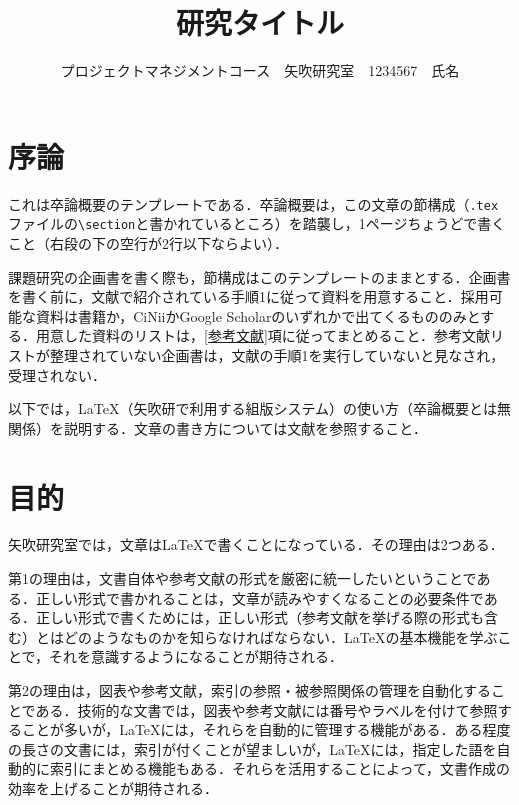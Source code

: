 \documentclass[uplatex,twocolumn,dvipdfmx]{jsarticle}
\title{\vspace{-5mm}\fontsize{14pt}{0pt}\selectfont 研究タイトル}
\author{\normalsize プロジェクトマネジメントコース　矢吹研究室　1234567　氏名}
\date{}
\begin{document}
\fontsize{10.5pt}{\baselineskip}\selectfont
\maketitle





\section{序論}

これは卒論概要のテンプレートである．卒論概要は，この文章の節構成（\verb|.tex|ファイルの\verb|\section|と書かれているところ）を踏襲し，1ページちょうどで書くこと（右段の下の空行が2行以下ならよい）．

課題研究の企画書を書く際も，節構成はこのテンプレートのままとする．企画書を書く前に，文献\cite{アイデアのつくり方}で紹介されている手順1に従って資料を用意すること．採用可能な資料は書籍か，CiNiiかGoogle Scholarのいずれかで出てくるもののみとする．用意した資料のリストは，\ref{参考文献}項に従ってまとめること．参考文献リストが整理されていない企画書は，文献\cite{アイデアのつくり方}の手順1を実行していないと見なされ，受理されない．

以下では，\LaTeX （矢吹研で利用する組版システム）の使い方（卒論概要とは無関係）を説明する．文章の書き方については文献\cite{書く技術}を参照すること．

\section{目的}

矢吹研究室では，文章は\LaTeX で書くことになっている．その理由は2つある．

第1の理由は，文書自体や参考文献の形式を厳密に統一したいということである．正しい形式で書かれることは，文章が読みやすくなることの必要条件である．正しい形式で書くためには，正しい形式（参考文献を挙げる際の形式も含む）とはどのようなものかを知らなければならない．\LaTeX の基本機能を学ぶことで，それを意識するようになることが期待される．

第2の理由は，図表や参考文献，索引の参照・被参照関係の管理を自動化することである．技術的な文書では，図表や参考文献には番号やラベルを付けて参照することが多いが，\LaTeX には，それらを自動的に管理する機能がある．ある程度の長さの文書には，索引が付くことが望ましいが，\LaTeX には，指定した語を自動的に索引にまとめる機能もある．それらを活用することによって，文書作成の効率を上げることが期待される．
\end{document}
